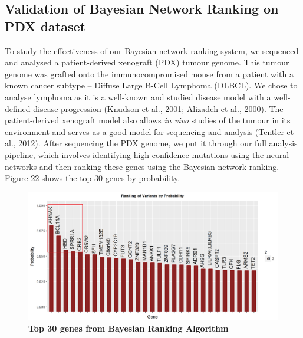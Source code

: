 \documentclass{article}
\begin{document}
\subsection{Validation of Bayesian Network Ranking on PDX dataset}
To study the effectiveness of our Bayesian network ranking system, we sequenced and analysed a patient-derived xenograft (PDX) tumour genome. This tumour genome was grafted onto the immunocompromised mouse from a patient with a known cancer subtype -- Diffuse Large B-Cell Lymphoma (DLBCL). We chose to analyse lymphoma as it is a well-known and studied disease model with a well-defined disease progression (Knudson et al., 2001; Alizadeh et al., 2000). The patient-derived xenograft model also allows \textit{in vivo} studies of the tumour in its environment and serves as a good model for sequencing and analysis (Tentler et al., 2012). After sequencing the PDX genome, we put it through our full analysis pipeline, which involves identifying high-confidence mutations using the neural networks and then ranking these genes using the Bayesian network ranking. Figure 22 shows the top 30 genes by probability. 

\begin{figure}[H]
\includegraphics[width=\textwidth]{bayesianranks.png}
\caption{\textbf{Top 30 genes from Bayesian Ranking Algorithm}}
\centering
\end{figure}
\end{document}
